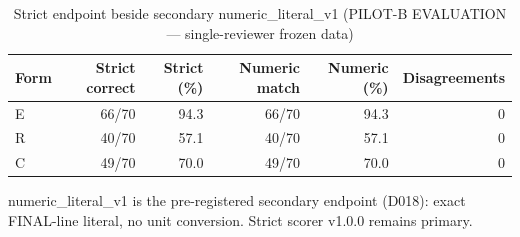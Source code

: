 \begin{table}[t]
\centering
\small
\caption{Strict endpoint beside secondary numeric\_literal\_v1 (PILOT-B EVALUATION --- single-reviewer frozen data)}
\label{tab:pilotb-Llama-3.2-3B-Instruct-numeric}
\begin{tabular}{lrrrrr}
\toprule
Form & Strict correct & Strict (\%) & Numeric match & Numeric (\%) & Disagreements \\
\midrule
E & 66/70 & 94.3 & 66/70 & 94.3 & 0 \\
R & 40/70 & 57.1 & 40/70 & 57.1 & 0 \\
C & 49/70 & 70.0 & 49/70 & 70.0 & 0 \\
\bottomrule
\end{tabular}
\par\smallskip
\parbox{\linewidth}{\footnotesize numeric\_literal\_v1 is the pre-registered secondary endpoint (D018): exact FINAL-line literal, no unit conversion. Strict scorer v1.0.0 remains primary.}
\end{table}
